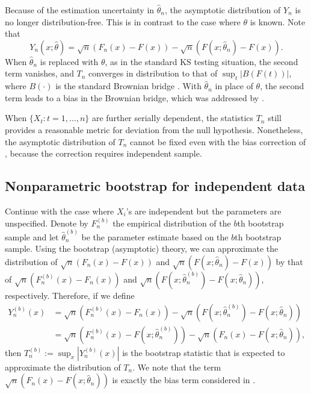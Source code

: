 \documentclass[APA,Times1COL]{WileyNJDv5} %
\begin{document}
Because of the estimation uncertainty in $\hat\theta_n$, the asymptotic
distribution of $Y_n$ is no longer distribution-free. This is in contrast to the
case where $\theta$ is known.  Note that
\begin{equation*}
Y_n(x; \hat\theta) = \sqrt{n}(F_n(x) - F(x)) - 
\sqrt{n}(F(x; \hat\theta_n) - F(x)).
\end{equation*}
When $\hat\theta_n$ is replaced with $\theta$, as in the standard KS testing
situation, the second term vanishes, and $T_n$ converges in distribution to that
of $\sup_t | B(F(t)) |$, where $B(\cdot)$ is the standard Brownian bridge
\citep{kolmogorov1933sulla}. With $\hat\theta_n$ in place of $\theta$, the
second term leads to a bias in the Brownian bridge, which was addressed by
\citet{babu2004goodness}.


When $\{X_t: t = 1, \ldots, n\}$ are further serially dependent, the statistics
$T_n$ still provides a reasonable metric for deviation from the null
hypothesis. Nonetheless, the asymptotic distribution of $T_n$ cannot be fixed
even with the bias correction of \citet{babu2004goodness}, because the
correction requires independent sample.

\subsection{Nonparametric bootstrap for independent data}

Continue with the case where $X_i$'s are independent but the parameters
are unspecified. Denote by
$F^{(b)}_n$ the empirical distribution of the $b$th bootstrap sample and let
$\hat\theta^{(b)}_n$ be the parameter estimate based on the $b$th bootstrap 
sample. 
Using the bootstrap (asymptotic) theory, we can approximate the distribution of
$\sqrt{n}(F_n(x) - F(x))$ and $\sqrt{n}(F(x; \hat\theta_n) - F(x))$
by that of $\sqrt{n}(F^{(b)}_n(x) - F_n(x))$ and
$\sqrt{n}(F(x; \hat\theta^{(b)}_n) - F(x; \hat\theta_n))$, respectively.
Therefore, if we define
\begin{align*}
Y^{(b)}_n(x) &= \sqrt{n}(F^{(b)}_n(x) - F_n(x)) - 
               \sqrt{n}(F(x; \hat\theta^{(b)}_n) - F(x; \hat\theta_n)) \\
             &= \sqrt{n}(F^{(b)}_n(x) - F(x; \hat\theta^{(b)}_n)) - 
               \sqrt{n}(F_n(x) - F(x; \hat\theta_n)),
\end{align*}
then $T^{(b)}_n := \sup_x|Y^{(b)}_n(x)|$ is the bootstrap statistic that is 
expected to approximate the distribution of $T_n$. We note that the term
$\sqrt{n}(F_n(x) - F(x; \hat\theta_n))$ is exactly the bias term considered in 
\citet{babu2004goodness}.
\end{document}
